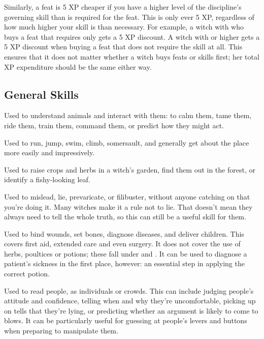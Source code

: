 Similarly, a feat is 5 XP cheaper if you have a higher level of the discipline's governing skill than is required for the feat.
This is only ever 5 XP, regardless of how much higher your skill is than necessary.
For example, a witch with  who buys a  feat that requires only  gets a 5 XP discount.
A witch with  or higher gets a 5 XP discount when buying a  feat that does not require the  skill at all.
This ensures that it does not matter whether a witch buys feats or skills first; her total XP expenditure should be the same either way.

\subsection{General Skills}


Used to understand animals and interact with them: to calm them, tame them, ride them, train them, command them, or predict how they might act.


Used to run, jump, swim, climb, somersault, and generally get about the place more easily and impressively.


Used to raise crops and herbs in a witch's garden, find them out in the forest, or identify a fishy-looking leaf.


Used to mislead, lie, prevaricate, or filibuster, without anyone catching on that you're doing it.
Many witches make it a rule not to lie.
That doesn't mean they always need to tell the whole truth, so this can still be a useful skill for them.


Used to bind wounds, set bones, diagnose diseases, and deliver children.
This covers first aid, extended care and even surgery.
It does not cover the use of herbs, poultices or potions; these fall under  and .
It can be used to diagnose a patient's sickness in the first place, however: an essential step in applying the correct potion.


Used to read people, as individuals or crowds.
This can include judging people's attitude and confidence, telling when and why they're uncomfortable, picking up on tells that they're lying, or predicting whether an argument is likely to come to blows.
It can be particularly useful for guessing at people's levers and buttons when preparing to manipulate them.

